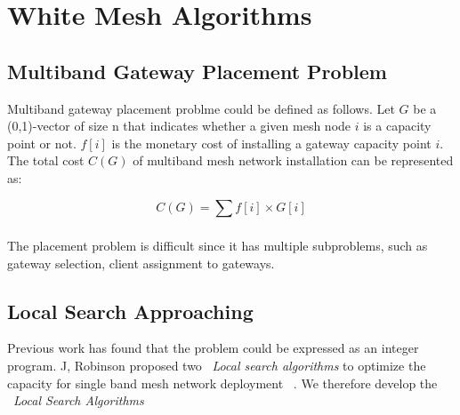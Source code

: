 \section{White Mesh Algorithms}
\label{sec:algorithms}

\subsection{Multiband Gateway Placement Problem}
\label{subsec:placementproblem}

Multiband gateway placement problme could be defined as follows. Let $G$ be a (0,1)-vector of size n that indicates whether a given mesh node $i$ is a capacity point or not. $f[i]$ is the monetary cost of installing a gateway capacity point $i$.
The total cost $C(G)$ of multiband mesh network installation can be represented as:

\begin{equation}
C(G)=\sum_{} f[i] \times G[i]
\end{equation}

The placement problem is difficult since it has multiple subproblems, such as gateway selection, client assignment to gateways. 

\subsection{Local Search Approaching}
Previous work has found that the problem could be expressed as an integer program. J, Robinson proposed two ~\emph{Local search algorithms} to optimize the capacity for single band mesh network deployment ~\cite{robinson2008adding}.
We therefore develop the ~\emph{Local Search Algorithms}










